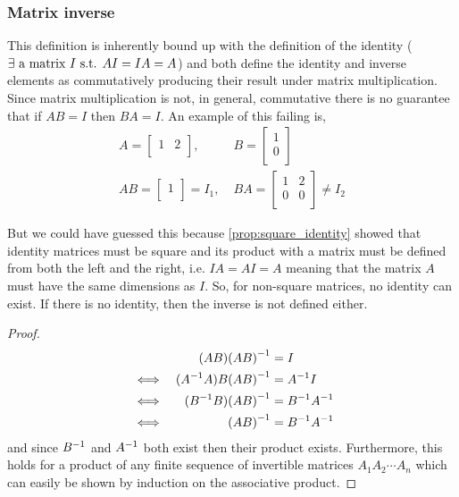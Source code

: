 \documentclass[MathsNotesBase.tex]{subfiles}
\begin{document}
{		\bigskip
		\subsubsection*{Matrix inverse}
		
		\medskip
		This definition is inherently bound up with the definition of the identity ($\exists \text{ a matrix } I \text{ s.t. } AI = IA = A$) and both define the identity and inverse elements as commutatively producing their result under matrix multiplication. Since matrix multiplication is not, in general, commutative there is no guarantee that if $AB = I$ then $BA = I$. An example of this failing is,
		\begin{align*}
			A = 
			\begin{bmatrix}
			1 & 2 \\
			\end{bmatrix},\;
			&B =
			\begin{bmatrix}
			1 \\
			0 \\
			\end{bmatrix}
			\\[10pt]
			AB = 
			\begin{bmatrix}
			1 \\
			\end{bmatrix} = I_1,\;
			&BA =
			\begin{bmatrix}
			1 & 2 \\
			0 & 0 \\
			\end{bmatrix} \neq I_2
		\end{align*}
		
		But we could have guessed this because \autoref{prop:square_identity} showed that identity matrices must be square and its product with a matrix must be defined from both the left and the right, i.e. $IA = AI = A$ meaning that the matrix $A$ must have the same dimensions as $I$. So, for non-square matrices, no identity can exist. If there is no identity, then the inverse is not defined either.
		
		\medskip
		\begin{proof}
		\begin{align*}
		& 	  &	(AB){(AB)}^{-1} &= I \\
		&\iff &	({A}^{-1}A)B{(AB)}^{-1} &= {A}^{-1}I \\
		&\iff &	({B}^{-1}B){(AB)}^{-1} &= {B}^{-1}{A}^{-1} \\
		&\iff &	{(AB)}^{-1} &= {B}^{-1}{A}^{-1} \\
		\end{align*}
		and since ${B}^{-1}$ and ${A}^{-1}$ both exist then their product exists.
		Furthermore, this holds for a product of any finite sequence of invertible matrices $A_1A_2\cdots A_n$ which can easily be shown by induction on the associative product.
		\end{proof}
	}
	
\end{document}
